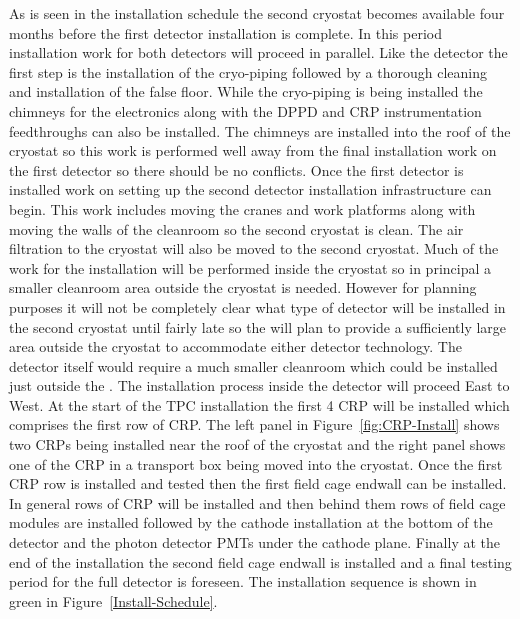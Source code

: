 As is seen in the installation schedule the second cryostat becomes
available four months before the first detector installation is
complete. In this period installation work for both detectors will
proceed in parallel. Like the  detector the first step is
the installation of the cryo-piping followed by a thorough cleaning
and installation of the false floor. While the cryo-piping is being
installed the  chimneys for the electronics along with the
DPPD and CRP instrumentation feedthroughs can also be installed. The
chimneys are installed into the roof of the cryostat so this work is
performed well away from the final installation work on the first
detector so there should be no conflicts. Once the first detector is
installed work on setting up the second detector installation
infrastructure can begin. This work includes moving the cranes and
work platforms along with moving the walls of the cleanroom so the
second cryostat is clean. The air filtration to the cryostat will also
be moved to the second cryostat.  Much of the work for the 
installation will be performed inside the cryostat so in principal a
smaller cleanroom area outside the cryostat is needed. However for
planning purposes it will not be completely clear what type of detector
will be installed in the second cryostat until fairly late so the 
will plan to provide a sufficiently large area outside the cryostat to
accommodate either detector technology.  The  detector itself
would require a much smaller cleanroom which could be installed just
outside the . The installation process inside the detector will
proceed East to West. At the start of the TPC installation the first
\num{4} CRP will be installed which comprises the first row of
CRP. The left panel in Figure~\ref{fig:CRP-Install} shows two CRPs
being installed near the roof of the cryostat and the right panel
shows one of the CRP in a transport box being moved into the cryostat.
Once the first CRP row is installed and tested then the first field
cage endwall can be installed. In general rows of CRP will be
installed and then behind them rows of field cage modules are
installed followed by the cathode installation at the bottom of the
detector and the photon detector PMTs under the cathode plane. Finally
at the end of the installation the second field cage endwall is
installed and a final testing period for the full detector is
foreseen. The  installation sequence is shown in green in
Figure~\ref{Install-Schedule}.
